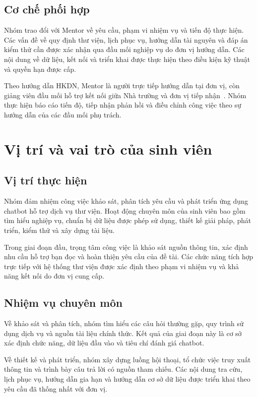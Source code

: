 \subsection{Cơ chế phối hợp}
Nhóm trao đổi với Mentor về yêu cầu, phạm vi nhiệm vụ và tiến độ thực hiện. Các vấn đề về quy định thư viện, lịch phục vụ, hướng dẫn tài nguyên và đáp án kiểm thử cần được xác nhận qua đầu mối nghiệp vụ do đơn vị hướng dẫn. Các nội dung về dữ liệu, kết nối và triển khai được thực hiện theo điều kiện kỹ thuật và quyền hạn được cấp.

Theo hướng dẫn HKDN, Mentor là người trực tiếp hướng dẫn tại đơn vị, còn giảng viên đầu mối hỗ trợ kết nối giữa Nhà trường và đơn vị tiếp nhận~\cite{hkdn-huong-dan}. Nhóm thực hiện báo cáo tiến độ, tiếp nhận phản hồi và điều chỉnh công việc theo sự hướng dẫn của các đầu mối phụ trách.

\section{Vị trí và vai trò của sinh viên}

\subsection{Vị trí thực hiện}
Nhóm đảm nhiệm công việc khảo sát, phân tích yêu cầu và phát triển ứng dụng chatbot hỗ trợ dịch vụ thư viện. Hoạt động chuyên môn của sinh viên bao gồm tìm hiểu nghiệp vụ, chuẩn bị dữ liệu được phép sử dụng, thiết kế giải pháp, phát triển, kiểm thử và xây dựng tài liệu.

Trong giai đoạn đầu, trọng tâm công việc là khảo sát nguồn thông tin, xác định nhu cầu hỗ trợ bạn đọc và hoàn thiện yêu cầu của đề tài. Các chức năng tích hợp trực tiếp với hệ thống thư viện được xác định theo phạm vi nhiệm vụ và khả năng kết nối do đơn vị cung cấp.

\subsection{Nhiệm vụ chuyên môn}
Về khảo sát và phân tích, nhóm tìm hiểu các câu hỏi thường gặp, quy trình sử dụng dịch vụ và nguồn tài liệu chính thức. Kết quả của giai đoạn này là cơ sở xác định chức năng, dữ liệu đầu vào và tiêu chí đánh giá chatbot.

Về thiết kế và phát triển, nhóm xây dựng luồng hội thoại, tổ chức việc truy xuất thông tin và trình bày câu trả lời có nguồn tham chiếu. Các nội dung tra cứu, lịch phục vụ, hướng dẫn gia hạn và hướng dẫn cơ sở dữ liệu được triển khai theo yêu cầu đã thống nhất với đơn vị.

